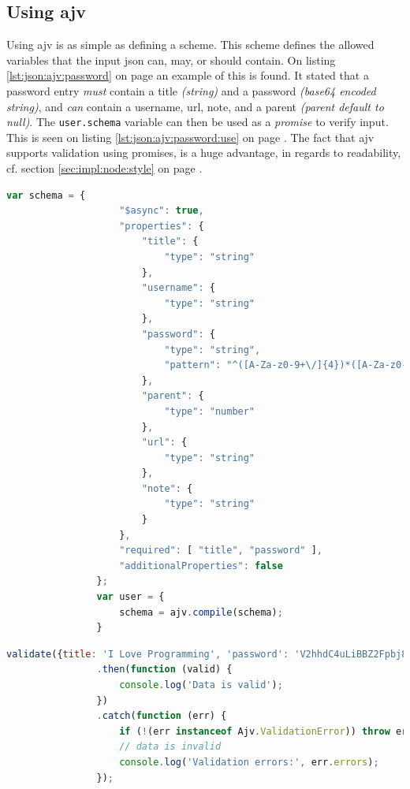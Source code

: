 		\subsection{Using ajv}
			Using ajv is as simple as defining a scheme. This scheme defines the allowed variables that the input json can, may, or should contain. On listing \ref{lst:json:ajv:password} on page \pageref{lst:json:ajv:password} an example of this is found. It stated that a password entry \emph{must} contain a title \emph{(string)} and a password \emph{(base64 encoded string)}, and \emph{can} contain a username, url, note, and a parent \emph{(parent default to null)}. The \verb=user.schema= variable can then be used as a \emph{promise} to verify input. This is seen on listing \ref{lst:json:ajv:password:use} on page \pageref{lst:json:ajv:password}. The fact that ajv supports validation using promises, is a huge advantage, in regards to readability, cf. section \ref{sec:impl:node:style} on page \pageref{sec:impl:node:style}.

			\begin{lstlisting}[gobble=16,language=JavaScript,caption={JSON schema for the password model, using ajv's notaiton.},label={lst:json:ajv:password},breakatwhitespace=false]
                var schema = {
                    "$async": true,
                    "properties": {
                        "title": {
                            "type": "string"
                        },
                        "username": {
                            "type": "string"
                        },
                        "password": {
                            "type": "string",
                            "pattern": "^([A-Za-z0-9+\/]{4})*([A-Za-z0-9+\/]{4}|[A-Za-z0-9+\/]{3}=|[A-Za-z0-9+\/]{2}==)$"
                        },
                        "parent": {
                            "type": "number"
                        },
                        "url": {
                            "type": "string"
                        },
                        "note": {
                            "type": "string"
                        }
                    },
                    "required": [ "title", "password" ],
                    "additionalProperties": false
                };
                var user = {
                    schema = ajv.compile(schema);
                }
				\end{lstlisting}

			\begin{lstlisting}[gobble=16,language=JavaScript,caption={Using the user schema for validating input, using ajv.},label={lst:json:ajv:password:use}]
                validate({title: 'I Love Programming', 'password': 'V2hhdC4uLiBBZ2Fpbj8h'))
                .then(function (valid) {
                    console.log('Data is valid');
                })
                .catch(function (err) {
                    if (!(err instanceof Ajv.ValidationError)) throw err;
                    // data is invalid
                    console.log('Validation errors:', err.errors);
                });
		\end{lstlisting}

